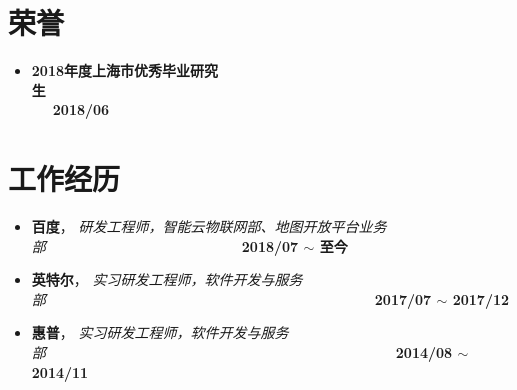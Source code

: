 \documentclass[letterpaper, UTF8, 11pt]{article}
\begin{document}
	\section*{\textbf{荣誉}}\vspace{-0.12in}
	\begin{itemize}
		\item \textbf{2018年度上海市优秀毕业研究生}~~~~~~~~~~~~~~~~~~~~~~~~~~~~~~~~~~~~~~~~~~~~~~~~~~~~~~~~~~~~~~~~~~~~~\textbf{2018/06}
	\end{itemize}
	\vspace{-0.32in}
	
	\section*{\textbf{工作经历}}\vspace{-0.12in}
	\begin{itemize}
		\item \textbf{百度}， \emph{研发工程师，智能云物联网部、地图开放平台业务部}~~~~~~~~~~~~~~~~~~~~~~~~~~~~\textbf{2018/07 $\sim$ 至今}
		\item \textbf{英特尔}， \emph{实习研发工程师，软件开发与服务部}~~~~~~~~~~~~~~~~~~~~~~~~~~~~~~~~~~~~~~~~~~~~~~~\textbf{2017/07 $\sim$ 2017/12}
		\item \textbf{惠普}， \emph{实习研发工程师，软件开发与服务部}~~~~~~~~~~~~~~~~~~~~~~~~~~~~~~~~~~~~~~~~~~~~~~~~~~\textbf{2014/08 $\sim$ 2014/11}
	\end{itemize}
	\vspace{-0.32in}
	
\end{document}
